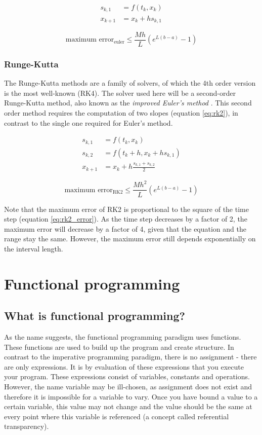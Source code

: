 \begin{align}
	\label{eq:euler}
	s_{k,1} &= f(t_{k},x_{k}) \\
	x_{k+1} &= x_{k} + h s_{k,1} \nonumber
\end{align}

\begin{equation}
\label{eq:euler_error}
\text{maximum error}_{\text{euler}} \leq \frac{M h}{L} (e^{L(b-a)} -1)
\end{equation}

\subsubsection{Runge-Kutta}
The Runge-Kutta methods are a family of solvers, of which the 4th order version is the most well-known (RK4). The solver used here will be a second-order Runge-Kutta method, also known as the \emph{improved Euler's method} \cite{DE}. This second order method requires the computation of two slopes (equation \ref{eq:rk2}), in contrast to the single one required for Euler's method.

\begin{align}
	\label{eq:rk2}
	s_{k,1} &= f(t_{k},x_{k}) \\
	s_{k,2} &= f(t_{k} + h,x_{k} + h s_{k,1}) \nonumber \\
	x_{k+1} &= x_{k} + h \frac{s_{k,1} + s_{k,2}}{2} \nonumber
\end{align}

\begin{equation}
\label{eq:rk2_error}
\text{maximum error}_{\text{RK2}} \leq \frac{M h^{2}}{L} (e^{L(b-a)} -1)
\end{equation}

Note that the maximum error of RK2 is proportional to the square of the time step (equation \ref{eq:rk2_error}). As the time step decreases by a factor of 2, the maximum error will decrease by a factor of 4, given that the equation and the range stay the same. However, the maximum error still depends exponentially on the interval length.


\section{Functional programming}
\lstset{style=haskellStyle}
\subsection{What is functional programming?}
As the name suggests, the functional programming paradigm uses functions. These functions are used to build up the program and create structure. In contrast to the imperative programming paradigm, there is no assignment - there are only expressions. It is by evaluation of these expressions that you execute your program. These expressions consist of variables, constants and operations. However, the name variable may be ill-chosen, as assignment does not exist and therefore it is impossible for a variable to vary. Once you have bound a value to a certain variable, this value may not change and the value should be the same at every point where this variable is referenced (a concept called referential transparency). 

